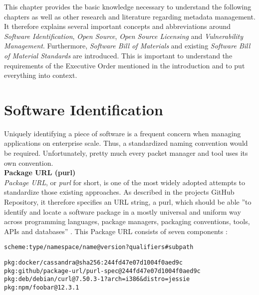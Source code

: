 
 \label{Foundations}
This chapter provides the basic knowledge necessary to understand the following chapters as well as other research and literature regarding metadata management. It therefore explains several important concepts and abbreviations around \textit{Software Identification}, \textit{Open Source}, \textit{Open Source Licensing} and \textit{Vulnerability Management}. Furthermore, \textit{Software Bill of Materials} and existing \textit{Software Bill of Material Standards} are introduced. This is important to understand the requirements of the Executive Order mentioned in the introduction and to put everything into context.

\section{Software Identification} \label{sec:Software Identification}
Uniquely identifying a piece of software is a frequent concern when managing applications on enterprise scale. Thus, a standardized naming convention would be required. Unfortunately, pretty much every packet manager and tool uses its own convention.\\

\noindent
\textbf{Package URL (purl)}\\
\noindent
\textit{Package URL}, or \emph{purl} for short, is one of the most widely adopted attempts to standardize those existing approaches. As described in the projects GitHub Repository, it therefore specifies an URL string, a purl, which should be able ''to identify and locate a software package in a mostly universal and uniform way across programming languages, package managers, packaging conventions, tools, APIs and databases'' \cite{purl}. This Package URL consists of seven components \cite{purl}:\\

\begin{lstlisting}[caption=Package URL Components, captionpos=b, label=lst:Purl]
scheme:type/namespace/name@version?qualifiers#subpath
\end{lstlisting}

\begin{lstlisting}[caption=Package URL Examples, captionpos=b, label=lst:Purl]
pkg:docker/cassandra@sha256:244fd47e07d1004f0aed9c
pkg:github/package-url/purl-spec@244fd47e07d1004f0aed9c
pkg:deb/debian/curl@7.50.3-1?arch=i386&distro=jessie
pkg:npm/foobar@12.3.1
\end{lstlisting}

